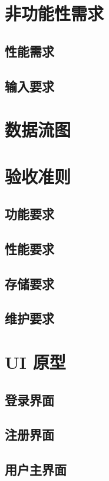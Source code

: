 \documentclass[12pt]{ctexart} %
\begin{document}
\section{非功能性需求}
\subsection{性能需求}

\subsection{输入要求}


\section{数据流图}

\section{验收准则}
\subsection{功能要求}

\subsection{性能要求}

\subsection{存储要求}

\subsection{维护要求}

\section{UI 原型}
\subsection{登录界面}

\subsection{注册界面}

\subsection{用户主界面}
\end{document}
